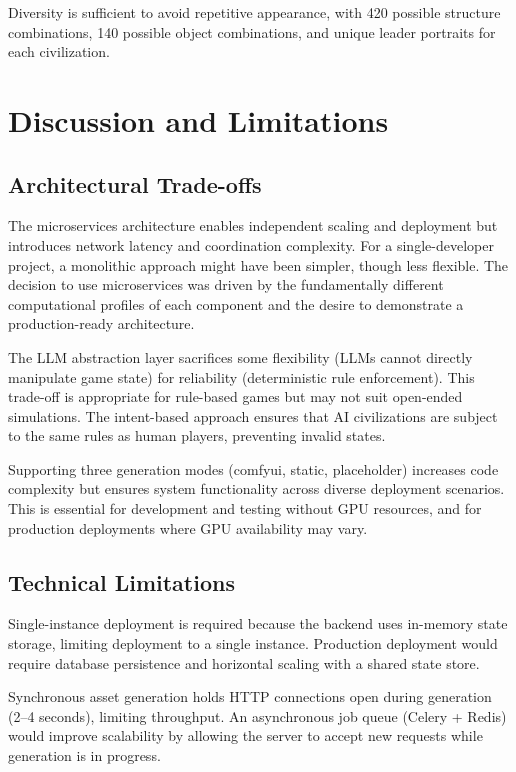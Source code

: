 \documentclass[conference]{IEEEtran}
\begin{document}
Diversity is sufficient to avoid repetitive appearance, with 420 possible structure combinations, 140 possible object combinations, and unique leader portraits for each civilization.

\section{Discussion and Limitations}
\label{sec:discussion}

\subsection{Architectural Trade-offs}

The microservices architecture enables independent scaling and deployment but introduces network latency and coordination complexity. For a single-developer project, a monolithic approach might have been simpler, though less flexible. The decision to use microservices was driven by the fundamentally different computational profiles of each component and the desire to demonstrate a production-ready architecture.

The LLM abstraction layer sacrifices some flexibility (LLMs cannot directly manipulate game state) for reliability (deterministic rule enforcement). This trade-off is appropriate for rule-based games but may not suit open-ended simulations. The intent-based approach ensures that AI civilizations are subject to the same rules as human players, preventing invalid states.

Supporting three generation modes (comfyui, static, placeholder) increases code complexity but ensures system functionality across diverse deployment scenarios. This is essential for development and testing without GPU resources, and for production deployments where GPU availability may vary.

\subsection{Technical Limitations}

Single-instance deployment is required because the backend uses in-memory state storage, limiting deployment to a single instance. Production deployment would require database persistence and horizontal scaling with a shared state store.

Synchronous asset generation holds HTTP connections open during generation (2--4 seconds), limiting throughput. An asynchronous job queue (Celery + Redis) would improve scalability by allowing the server to accept new requests while generation is in progress.
\end{document}
